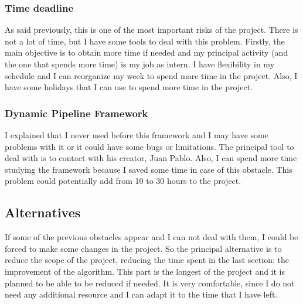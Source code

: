 \subsubsection*{Time deadline}
As said previously, this is one of the most important risks of the project. There is not a lot of time, but I have some tools to deal with this problem.
Firstly, the main objective is to obtain more time if needed and my principal activity (and the one that spends more time) is my job as intern.
I have flexibility in my schedule and I can reorganize my week to spend more time in the project.
Also, I have some holidays that I can use to spend more time in the project.
\subsubsection*{Dynamic Pipeline Framework}
I explained that I never used before this framework and I may have some problems with it or it could have some bugs or limitations.
The principal tool to deal with is to contact with his creator, Juan Pablo. Also, I can spend more time studying the framework because I saved some time in case of this obstacle.
This problem could potentially add from 10 to 30 hours to the project.
\subsection{Alternatives}
If some of the previous obstacles appear and I can not deal with them, I could be forced to make some changes in the project.
So the principal alternative is to reduce the scope of the project, reducing the time spent in the last section: the improvement of the algorithm.
This part is the longest of the project and it is planned to be able to be reduced if needed.
It is very comfortable, since I do not need any additional resource and I can adapt it to the time that I have left.
